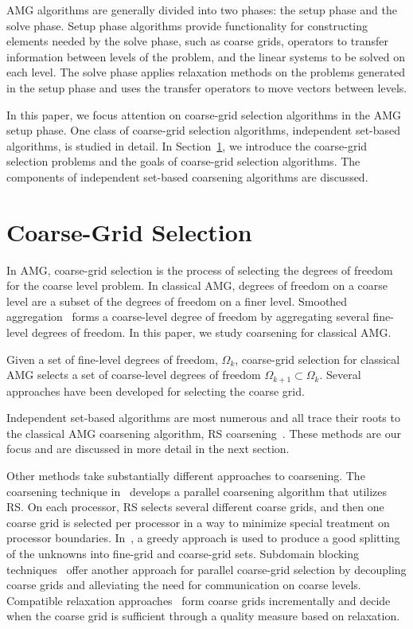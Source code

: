 \documentclass{elsart}
\begin{document}
AMG algorithms are generally divided into two phases: the setup phase
and the solve phase. Setup phase algorithms provide functionality for
constructing elements needed by the solve phase, such as coarse grids,
operators to transfer information between levels of the problem, and
the linear systems to be solved on each level. The solve phase applies
relaxation methods on the problems generated in the setup phase and
uses the transfer operators to move vectors between levels.

In this paper, we focus attention on coarse-grid selection algorithms
in the AMG setup phase. One class of coarse-grid selection algorithms,
independent set-based algorithms, is studied in detail. In
Section~\ref{sec:cgs}, we introduce the coarse-grid selection problems
and the goals of coarse-grid selection algorithms. The components of
independent set-based coarsening algorithms are discussed. 

\section{Coarse-Grid Selection}
\label{sec:cgs}
In AMG, coarse-grid selection is the process of selecting the degrees
of freedom for the coarse level problem. In classical AMG, degrees of
freedom on a coarse level are a subset of the degrees of freedom on a
finer level. Smoothed
aggregation~\cite{Vanek1996,Vanek2001,brezina2005} forms a
coarse-level degree of freedom by aggregating several fine-level
degrees of freedom. In this paper, we study coarsening for classical
AMG.

Given a set of fine-level degrees of freedom, $\Omega_k$, coarse-grid
selection for classical AMG selects a set of coarse-level degrees of
freedom $\Omega_{k+1} \subset \Omega_k$. Several approaches have been
developed for selecting the coarse grid.

Independent set-based algorithms are most numerous and all trace their
roots to the classical AMG coarsening algorithm, RS
coarsening~\cite{Ruge1987}. These methods are our focus and are
discussed in more detail in the next section.

Other methods take substantially different approaches to
coarsening. The coarsening technique in~\cite{Griebel2006} develops a
parallel coarsening algorithm that utilizes RS. On each processor, RS
selects several different coarse grids, and then one coarse grid is
selected per processor in a way to minimize special treatment on
processor boundaries. In~\cite{MacLachlan2006}, a greedy approach is
used to produce a good splitting of the unknowns into fine-grid and
coarse-grid sets. Subdomain blocking techniques~\cite{Krechel2001}
offer another approach for parallel coarse-grid selection by
decoupling coarse grids and alleviating the need for communication on
coarse levels. Compatible relaxation
approaches~\cite{Brandt2000,Livne2004,Brannick2005} form coarse grids
incrementally and decide when the coarse grid is sufficient through a
quality measure based on relaxation.
\end{document}
